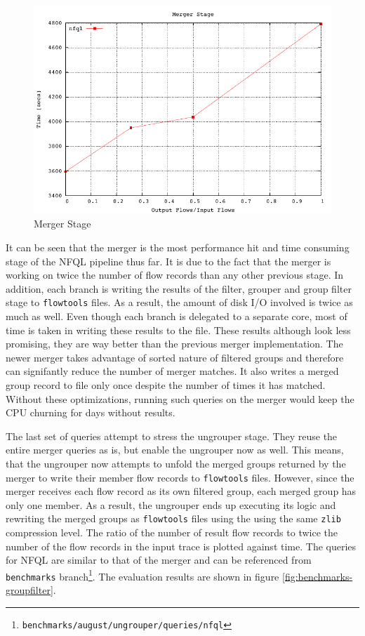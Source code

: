 \begin{figure}[h!]
  \begin{center}
    \includegraphics* [width=0.8\linewidth]{figures/benchmarks/merger}
    \caption{Merger Stage}
    \label{fig:benchmarks-merger}
  \end{center}
\end{figure}

It can be seen that the merger is the most performance hit and time consuming
stage of the \ac{NFQL} pipeline thus far. It is due to the fact that the
merger is working on twice the number of flow records than any other previous
stage. In addition, each branch is writing the results of the filter, grouper
and group filter stage to \texttt{flowtools} files. As a result, the amount of
disk I/O involved is twice as much as well. Even  though each branch is delegated to a separate core, most
of time is taken in writing these results to the file. These results
although look less promising, they are way better than the previous merger
implementation. The newer merger takes advantage of sorted nature of
filtered groups and therefore can signifantly reduce the number of merger
matches. It also writes a merged group record to file only once despite the
number of times it has matched. Without these optimizations, running such
queries on the merger would keep the CPU churning for days without results.


The last set of queries attempt to stress the ungrouper stage. They reuse the
entire merger queries as is, but enable the ungrouper now as well. This means,
that the ungrouper now attempts to unfold the merged groups returned by the
merger to write their member flow records to \texttt{flowtools} files.
However, since the merger receives each flow record as its
 own filtered group, each merged group has
only one member. As a result, the ungrouper ends up executing its logic and
rewriting the merged groups as \texttt{flowtools} files using the using the
same \texttt{zlib} compression level. The ratio of the number of result flow
records to twice the number of the flow records in the input trace is plotted
against time. The queries for \ac{NFQL} are similar to that of the merger and
can be referenced from \texttt{benchmarks}
branch\footnote{\texttt{benchmarks/august/ungrouper/queries/nfql}}.  The
evaluation results are shown in figure \ref{fig:benchmarks-groupfilter}.

